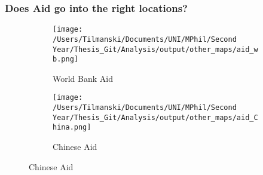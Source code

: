 \documentclass[]{beamer}   	%
\begin{document}
\begin{frame}
\frametitle{Does Aid go into the right locations?}
\begin{figure}[t]
\centering
\caption{Spatial Distribution of Development Aid Projects}

\begin{subfigure}[c]{0.48\textwidth}
\texttt{[image: /Users/Tilmanski/Documents/UNI/MPhil/Second Year/Thesis\_Git/Analysis/output/other\_maps/aid\_wb.png]}
\caption{World Bank Aid}
\label{fig:WB_aid_map}
\end{subfigure}
\begin{subfigure}[c]{0.48\textwidth}
\texttt{[image: /Users/Tilmanski/Documents/UNI/MPhil/Second Year/Thesis\_Git/Analysis/output/other\_maps/aid\_China.png]}
\caption{Chinese Aid}
\label{fig:China_aid_map}
\end{subfigure}

\label{fig:Aid_maps}
\end{figure}
\end{frame}
\end{document}
